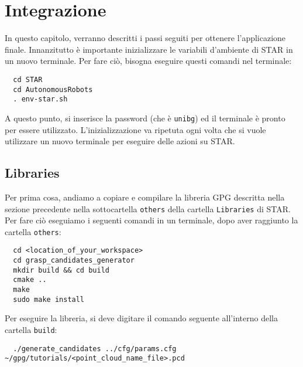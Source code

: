 \documentclass{report}
\begin{document}
\newpage
\chapter{Integrazione}\label{integrazione}
In questo capitolo, verranno descritti i passi seguiti per ottenere l'applicazione finale. Innanzitutto è importante inizializzare le variabili d'ambiente di STAR in un nuovo terminale. Per fare ciò, bisogna eseguire questi comandi nel terminale:
\begin{verbatim}
  cd STAR
  cd AutonomousRobots
  . env-star.sh
\end{verbatim}
A questo punto, si inserisce la password (che è \texttt{unibg}) ed il terminale è pronto per essere utilizzato. L'inizializzazione va ripetuta ogni volta che si vuole utilizzare un nuovo terminale per eseguire delle azioni su STAR. 
\section{Libraries}
Per prima cosa, andiamo a copiare e compilare la libreria GPG descritta nella sezione precedente nella sottocartella \texttt{others} della cartella \texttt{Libraries} di STAR. Per fare ciò eseguiamo i seguenti comandi in un terminale, dopo aver raggiunto la cartella \texttt{others}:
\begin{verbatim}
  cd <location_of_your_workspace>  
  cd grasp_candidates_generator
  mkdir build && cd build
  cmake ..
  make
  sudo make install
\end{verbatim}
Per eseguire la libreria, si deve digitare il comando seguente all'interno della cartella \texttt{build}:
\begin{verbatim}
  ./generate_candidates ../cfg/params.cfg ~/gpg/tutorials/<point_cloud_name_file>.pcd
\end{verbatim}
\end{document}
